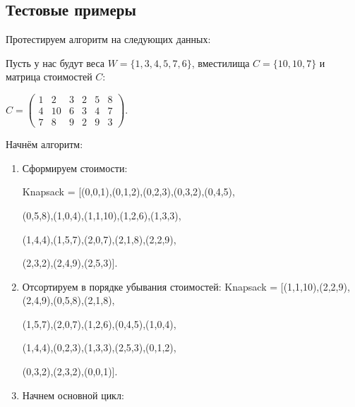 \documentclass[14pt,a4paper]{extarticle}
\begin{document}
\subsection{Тестовые примеры}

Протестируем алгоритм на следующих данных:

Пусть у нас будут веса $W = \{1,3,4,5,7,6\}$, вместилища $C = \{10,10,7\}$ и матрица стоимостей $C$:

$C = \begin{pmatrix}
  1 & 2 & 3 & 2 & 5 & 8\\
  4 & 10 & 6 & 3 & 4 & 7\\
  7 & 8 & 9 & 2 & 9 & 3
\end{pmatrix}$.

Начнём алгоритм:

\begin{enumerate}

\item Сформируем стоимости:

Knapsack = [(0,0,1),(0,1,2),(0,2,3),(0,3,2),(0,4,5),

(0,5,8),(1,0,4),(1,1,10),(1,2,6),(1,3,3),

(1,4,4),(1,5,7),(2,0,7),(2,1,8),(2,2,9),

(2,3,2),(2,4,9),(2,5,3)].

\item Отсортируем в порядке убывания стоимостей: Knapsack = [(1,1,10),(2,2,9),(2,4,9),(0,5,8),(2,1,8),

(1,5,7),(2,0,7),(1,2,6),(0,4,5),(1,0,4),

(1,4,4),(0,2,3),(1,3,3),(2,5,3),(0,1,2),

(0,3,2),(2,3,2),(0,0,1)].

\item Начнем основной цикл:


\end{enumerate}
\end{document}
